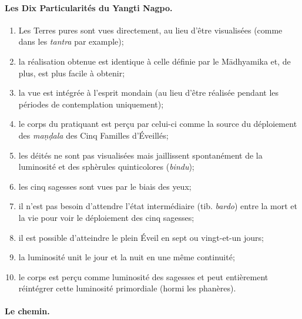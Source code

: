 \documentclass[11pt,a4paper]{article}
\newcommand\yangti{Yangti Nagpo\xspace}
\begin{document}
\paragraph{Les Dix Particularités du \yangti.}

\begin{enumerate}

  \item Les Terres pures sont vues directement, au lieu d'être
    visualisées (comme dans les \emph{tantra} par example);

  \item la réalisation obtenue est identique à celle définie par le
    M\=adhyamika et, de plus, est plus facile à obtenir;

  \item la vue est intégrée à l'esprit mondain (au lieu d'être
    réalisée pendant les périodes de contemplation uniquement);

  \item le corps du pratiquant est perçu par celui\hyp{}ci comme la
    source du déploiement des \emph{ma\d{n}\d{d}ala} des Cinq Familles
    d'Éveillés;

  \item les déités ne sont pas visualisées mais jaillissent
    spontanément de la luminosité et des sphèrules quinticolores
    (\emph{bindu});

  \item les cinq sagesses sont vues par le biais des yeux;

  \item il n'est pas besoin d'attendre l'état intermédiaire
    (tib. \emph{bardo}) entre la mort et la vie pour voir le
    déploiement des cinq sagesses;

  \item il est possible d'atteindre le plein Éveil en sept ou
    vingt\hyp{}et\hyp{}un jours;

  \item la luminosité unit le jour et la nuit en une même continuité;

  \item le corps est perçu comme luminosité des sagesses et peut
    entièrement réintégrer cette luminosité primordiale (hormi les
    phanères).

\end{enumerate}

\paragraph{Le chemin.}
\end{document}
